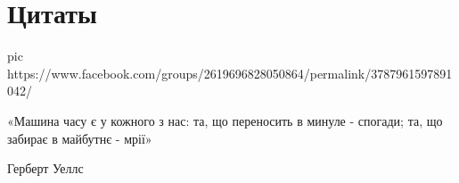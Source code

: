  
 
 

\section{Цитаты}
\label{sec:citations}

\ifcmt
pic https://www.facebook.com/groups/2619696828050864/permalink/3787961597891042/
\fi

«Машина часу є у кожного з нас: та, що переносить в минуле - спогади; та, що
забирає в майбутнє - мрії»

Герберт Уеллс
